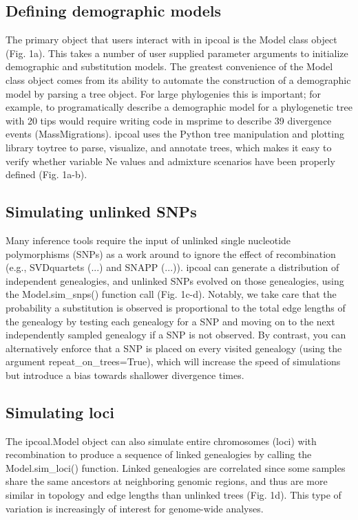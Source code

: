 \documentclass[11pt]{article}
\begin{document}
\subsection{Defining demographic models}
The primary object that users interact with in ipcoal is the Model class object (Fig. 1a). This takes a number of user supplied parameter arguments to initialize demographic and substitution models. The greatest convenience of the Model class object comes from its ability to automate the construction of a demographic model by parsing a tree object. For large phylogenies this is important; for example, to programatically describe a demographic model for a phylogenetic tree with 20 tips would require writing code in msprime to describe 39 divergence events (MassMigrations). ipcoal uses the Python tree manipulation and plotting library toytree \cite{eaton_toytree_nodate} to parse, visualize, and annotate trees, which makes it easy to verify whether variable Ne values and admixture scenarios have been properly defined (Fig. 1a-b). 

\subsection{Simulating unlinked SNPs}
Many inference tools require the input of unlinked single nucleotide polymorphisms (SNPs) as a work around to ignore the effect of recombination (e.g., SVDquartets (...) and SNAPP (...)). ipcoal can generate a distribution of independent genealogies, and unlinked SNPs evolved on those genealogies, using the Model.sim\_snps() function call (Fig. 1c-d). Notably, we take care that the probability a substitution is observed is proportional to the total edge lengths of the genealogy by testing each genealogy for a SNP and moving on to the next independently sampled genealogy if a SNP is not observed. By contrast, you can alternatively enforce that a SNP is placed on every visited genealogy (using the argument repeat\_on\_trees=True), which will increase the speed of simulations but introduce a bias towards shallower divergence times. 

\subsection{Simulating loci}
The ipcoal.Model object can also simulate entire chromosomes (loci) with recombination to produce a sequence of linked genealogies by calling the Model.sim\_loci() function. Linked genealogies are correlated since some samples share the same ancestors at neighboring genomic regions, and thus are more similar in topology and edge lengths than unlinked trees (Fig. 1d). This type of variation is increasingly of interest for genome-wide analyses.
\end{document}
